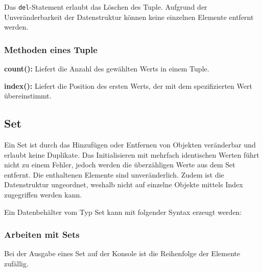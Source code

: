 Das \lstinline$del$-Statement erlaubt das Löschen des Tuple. Aufgrund der Unveränderbarkeit der Datenstruktur können keine einzelnen Elemente entfernt werden.

\label{collections:lst:tupledelete}      

\subsubsection{Methoden eines Tuple}
\label{collections:tuplemethodes}

\textbf{count():}
Liefert die Anzahl des gewählten Werts in einem Tuple.
    
\label{collections:lst:tuplecount}  

\textbf{index():}
Liefert die Position des ersten Werts, der mit dem spezifizierten Wert übereinstimmt.

\label{collections:lst:tupleindexmethode}  

\subsection{Set}
\label{collections:set}
Ein Set ist durch das Hinzufügen oder Entfernen von Objekten veränderbar und erlaubt keine Duplikate. Das Initialisieren mit mehrfach identischen Werten führt nicht zu einem Fehler, jedoch werden die überzähligen Werte aus dem Set entfernt. Die enthaltenen Elemente sind unveränderlich. Zudem ist die Datenstruktur ungeordnet, weshalb nicht auf einzelne Objekte mittels Index zugegriffen werden kann. 

Ein Datenbehälter vom Typ Set kann mit folgender Syntax erzeugt werden:

\label{collections:lst:setinit}  
    
\subsubsection{Arbeiten mit Sets}
\label{collections:workwithset}
Bei der Ausgabe eines Set auf der Konsole ist die Reihenfolge der Elemente zufällig. %


